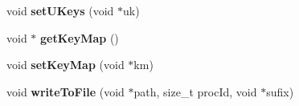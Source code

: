 \begin{DoxyCompactItemize}
void {\bfseries set\+U\+Keys} (void $\ast$uk)
\item 
\hypertarget{classfaster_1_1workerIFddCore_a065cd6138cead50c2514a788d8defaf8}{}\label{classfaster_1_1workerIFddCore_a065cd6138cead50c2514a788d8defaf8} 
void $\ast$ {\bfseries get\+Key\+Map} ()
\item 
\hypertarget{classfaster_1_1workerIFddCore_ace949a8731345dd01fd027b0cae57bb6}{}\label{classfaster_1_1workerIFddCore_ace949a8731345dd01fd027b0cae57bb6} 
void {\bfseries set\+Key\+Map} (void $\ast$km)
\item 
\hypertarget{classfaster_1_1workerIFddCore_a137e975a62b245883efac9f3b5a57341}{}\label{classfaster_1_1workerIFddCore_a137e975a62b245883efac9f3b5a57341} 
void {\bfseries write\+To\+File} (void $\ast$path, size\+\_\+t proc\+Id, void $\ast$sufix)
\end{DoxyCompactItemize}
